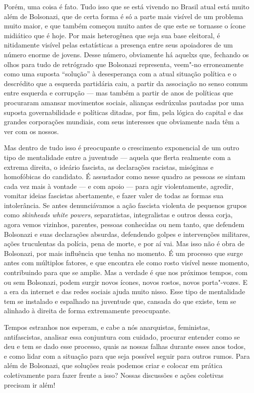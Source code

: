 Porém, uma coisa é fato. Tudo isso que se está vivendo no Brasil atual está muito além de Bolsonazi, que de certa forma é só a parte mais visível de um problema muito maior, e que também começou muito antes de que este se tornasse o ícone midiático que é hoje. Por mais heterogênea que seja sua base eleitoral, é nitidamente visível pelas estatísticas a presença entre seus apoiadores de um número enorme de jovens. Desse número, obviamente há aquelxs que, fechando os olhos para tudo de retrógrado que Bolsonazi representa, veem"-no erroneamente  como uma suposta ``solução'' à desesperança com a atual situação política e o descrédito que a esquerda partidária caiu, a partir da associação no senso comum entre esquerda e corrupção --- mas também a partir de anos de políticas que procuraram amansar movimentos sociais, alianças esdrúxulas pautadas por uma suposta governabilidade e políticas ditadas, por fim, pela lógica do capital e das grandes corporações mundiais, com seus interesses que obviamente nada têm a ver com os nossos.

Mas dentro de tudo isso é preocupante o crescimento exponencial de um outro tipo de mentalidade entre a juventude --- aquela que flerta realmente com a extrema direita, o ideário fascista, as declarações racistas, misóginas e homofóbicas do candidato. É assustador como nesse quadro as pessoas se sintam cada vez mais à vontade --- e com apoio --- para agir violentamente, agredir, vomitar ideias fascistas abertamente, e fazer valer de todas as formas sua intolerância. Se antes denunciávamos a ação fascista violenta de pequenos grupos como \emph{skinheads white powers}, separatistas, integralistas e outros dessa corja, agora vemos vizinhos, parentes, pessoas conhecidas ou nem tanto, que defendem Bolsonazi e suas declarações absurdas, defendendo golpes e intervenções militares, ações truculentas da polícia, pena de morte, e por aí vai. Mas isso não é obra de Bolsonazi, por mais influência que tenha no momento. É um processo que surge antes com múltiplos fatores, e que encontra ele como rosto visível nesse momento, contribuindo para que se amplie. Mas a verdade é que nos próximos tempos, com ou sem Bolsonazi, podem surgir novos ícones, novos rostos, novos porta"-vozes. E a era da internet e das redes sociais ajuda muito nisso. Esse tipo de mentalidade tem se instalado e espalhado na juventude que, cansada do que existe, tem se alinhado à direita de forma extremamente preocupante.

Tempos estranhos nos esperam, e cabe a nós anarquistas, feministas, antifascistas, analisar essa conjuntura com cuidado, procurar entender como se deu e tem se dado esse processo, quais as nossas falhas durante esses anos todos, e como lidar com a situação para que seja possível seguir para outros rumos. Para além de Bolsonazi, que soluções reais podemos criar e colocar em prática coletivamente para fazer frente a isso? Nossas discussões e ações coletivas precisam ir além!

